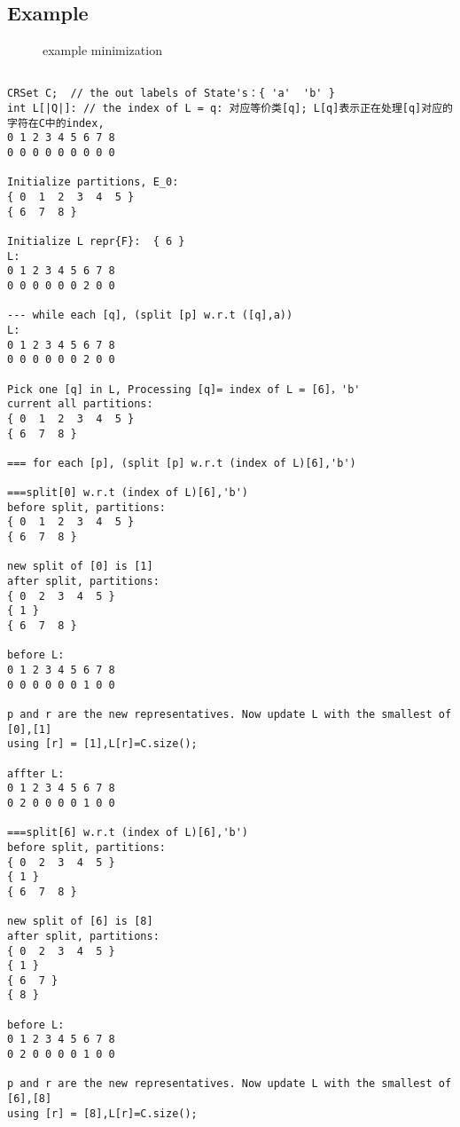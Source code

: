 \subsection{Example}

\begin{figure} \centering 
	\caption{ example minimization } 
	\label{fig:mini-ex} 
\end{figure}



\begin{lstlisting}

CRSet C;  // the out labels of State's：{ 'a'  'b' }
int L[|Q|]: // the index of L = q: 对应等价类[q]; L[q]表示正在处理[q]对应的字符在C中的index,
0 1 2 3 4 5 6 7 8
0 0 0 0 0 0 0 0 0

Initialize partitions, E_0:
{ 0  1  2  3  4  5 }
{ 6  7  8 }

Initialize L repr{F}:  { 6 }
L:
0 1 2 3 4 5 6 7 8
0 0 0 0 0 0 2 0 0

--- while each [q], (split [p] w.r.t ([q],a))
L:
0 1 2 3 4 5 6 7 8
0 0 0 0 0 0 2 0 0

Pick one [q] in L, Processing [q]= index of L = [6]，'b'
current all partitions:
{ 0  1  2  3  4  5 }
{ 6  7  8 }

=== for each [p], (split [p] w.r.t (index of L)[6],'b')

===split[0] w.r.t (index of L)[6],'b')
before split, partitions:
{ 0  1  2  3  4  5 }
{ 6  7  8 }

new split of [0] is [1]
after split, partitions:
{ 0  2  3  4  5 }
{ 1 }
{ 6  7  8 }

before L:
0 1 2 3 4 5 6 7 8
0 0 0 0 0 0 1 0 0

p and r are the new representatives. Now update L with the smallest of [0],[1]
using [r] = [1],L[r]=C.size();

affter L:
0 1 2 3 4 5 6 7 8
0 2 0 0 0 0 1 0 0

===split[6] w.r.t (index of L)[6],'b')
before split, partitions:
{ 0  2  3  4  5 }
{ 1 }
{ 6  7  8 }

new split of [6] is [8]
after split, partitions:
{ 0  2  3  4  5 }
{ 1 }
{ 6  7 }
{ 8 }

before L:
0 1 2 3 4 5 6 7 8
0 2 0 0 0 0 1 0 0

p and r are the new representatives. Now update L with the smallest of [6],[8]
using [r] = [8],L[r]=C.size();


\end{lstlisting}
